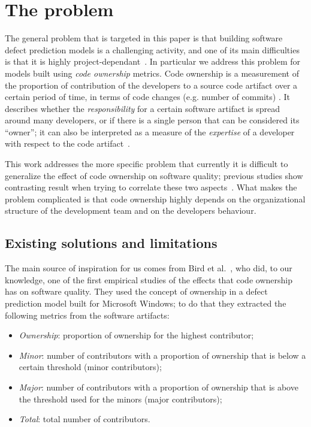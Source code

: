 \section{The problem}
The general problem that is targeted in this paper is that building software defect prediction models is a challenging activity, and one of its main difficulties is that it is highly project-dependant~\cite{zimmermann2009cross-project}.
In particular we address this problem for models built using \textit{code ownership} metrics. Code ownership is a measurement of the proportion of contribution of the developers to a source code artifact over a certain period of time, in terms of code changes (e.g. number of commits) \cite{Greiler:replication}. It describes whether the \textit{responsibility} for a certain software artifact is spread around many developers, or if there is a single person that can be considered its ``owner'';  it can also be interpreted as a measure of the \textit{expertise} of a developer with respect to the code artifact~\cite{bird:original}.


This work addresses the more specific problem that currently it is difficult to generalize the effect of code ownership on software quality; previous studies show contrasting result when trying to correlate these two aspects~\cite{bird:original, Foucault:oss, Greiler:replication}. What makes the problem complicated is that code ownership highly depends on the organizational structure of the development team and on the developers behaviour.

\subsection{Existing solutions and limitations}
\label{sec:existing_solutions}
The main source of inspiration for us comes from Bird et
al.~\cite{bird:original}, who did, to our knowledge, one of the first empirical studies of the effects that code ownership has on software quality. They used the concept of ownership in a defect prediction model built for Microsoft Windows; to do that they extracted the following metrics from the software artifacts: 
\begin{itemize}
\item \textit{Ownership}: proportion of ownership for the highest contributor;
\item \textit{Minor}: number of contributors with a proportion of ownership that is below a certain threshold (minor contributors);
\item \textit{Major}: number of contributors with a proportion of ownership that is above the threshold used for the minors (major contributors);
\item \textit{Total}: total number of contributors.
\end{itemize}

